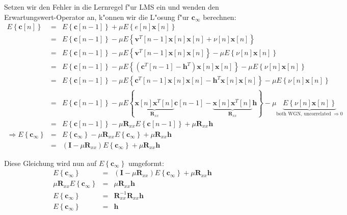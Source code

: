 Setzen wir den Fehler in die Lernregel f"ur LMS ein und wenden den Erwartungswert-Operator an, k"onnen wir die L"osung f"ur $\mathbf{c}_\infty$ berechnen:
\begin{eqnarray}
  E \left\lbrace \mathbf{c}[n] \right\rbrace & = & E \left\lbrace \mathbf{c}[n-1] \right\rbrace + \mu E \left\lbrace e[n] \mathbf{x}[n] \right\rbrace \\
  & = & E \left\lbrace \mathbf{c}[n-1] \right\rbrace - \mu E \left\lbrace \mathbf{v}^T[n-1] \mathbf{x}[n] \mathbf{x}[n] + \nu[n] \mathbf{x}[n] \right\rbrace \\
  & = & E \left\lbrace \mathbf{c}[n-1] \right\rbrace - \mu E \left\lbrace \mathbf{v}^T[n-1] \mathbf{x}[n] \mathbf{x}[n] \right\rbrace - \mu E \left\lbrace \nu[n] \mathbf{x}[n] \right\rbrace \\
  & = & E \left\lbrace \mathbf{c}[n-1] \right\rbrace - \mu E \left\lbrace \left( \mathbf{c}^T[n-1] - \mathbf{h}^T \right) \mathbf{x}[n] \mathbf{x}[n] \right\rbrace - \mu E \left\lbrace \nu[n] \mathbf{x}[n] \right\rbrace \\
  & = & E \left\lbrace \mathbf{c}[n-1] \right\rbrace - \mu E \left\lbrace \mathbf{c}^T[n-1] \mathbf{x}[n] \mathbf{x}[n] - \mathbf{h}^T \mathbf{x}[n] \mathbf{x}[n] \right\rbrace - \mu E \left\lbrace \nu[n] \mathbf{x}[n] \right\rbrace \\
  & = & E \left\lbrace \mathbf{c}[n-1] \right\rbrace - \mu E \left\lbrace \underbrace{\mathbf{x}[n] \mathbf{x}^T[n]}_{\mathbf{R}_{xx}} \mathbf{c}[n-1] - \underbrace{\mathbf{x}[n] \mathbf{x}^T[n]}_{\mathbf{R}_{xx}} \mathbf{h} \right\rbrace - \mu \underbrace{E \left\lbrace \nu[n] \mathbf{x}[n] \right\rbrace}_{\text{both WGN, uncorrelated} \; \Rightarrow 0} \\
  & = & E \left\lbrace \mathbf{c}[n-1] \right\rbrace - \mu \mathbf{R}_{xx} E \left\lbrace \mathbf{c}[n-1] \right\rbrace + \mu \mathbf{R}_{xx} \mathbf{h} \\
  \Rightarrow E \left\lbrace \mathbf{c}_\infty \right\rbrace & = & E \left\lbrace \mathbf{c}_\infty \right\rbrace - \mu \mathbf{R}_{xx} E \left\lbrace \mathbf{c}_\infty \right\rbrace + \mu \mathbf{R}_{xx} \mathbf{h} \\
  & = & \left( \mathbf{I} - \mu \mathbf{R}_{xx} \right) E \left\lbrace \mathbf{c}_\infty \right\rbrace + \mu \mathbf{R}_{xx} \mathbf{h}
\end{eqnarray}

Diese Gleichung wird nun auf $E \left\lbrace \mathbf{c}_\infty \right\rbrace$ umgeformt:
\begin{eqnarray}
 E \left\lbrace \mathbf{c}_\infty \right\rbrace & = & \left( \mathbf{I} - \mu \mathbf{R}_{xx} \right) E \left\lbrace \mathbf{c}_\infty \right\rbrace + \mu \mathbf{R}_{xx} \mathbf{h} \\
 \mu \mathbf{R}_{xx} E \left\lbrace \mathbf{c}_\infty \right\rbrace & = & \mu \mathbf{R}_{xx} \mathbf{h} \\
 E \left\lbrace \mathbf{c}_\infty \right\rbrace & = & \mathbf{R}_{xx}^{-1} \mathbf{R}_{xx} \mathbf{h} \\
 E \left\lbrace \mathbf{c}_\infty \right\rbrace & = & \mathbf{h}
\end{eqnarray}

